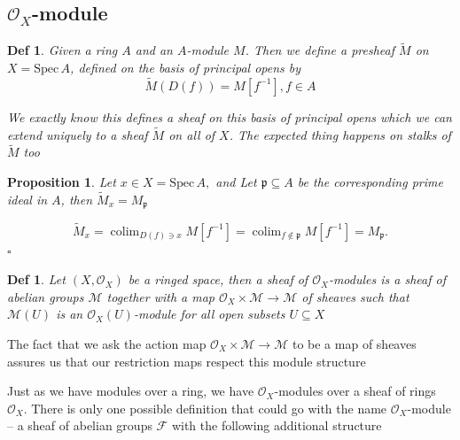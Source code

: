 \documentclass{article}
\newtheorem{definition}[theorem]{Def}
\newtheorem{proposition}[theorem]{Proposition}
\newenvironment{Proof}{{\noindent \indent \it Proof:\quad}}{\hfill $\square$\par}
\begin{document}



\newpage
\subsection{$\mathcal O_X$-module}
\begin{definition}
    Given a ring $A$ and an $A$-module $M$. Then we define a presheaf $\widetilde{M}$ on $X={\mathrm{Spec}}\,A$, defined on the basis of principal opens by
$$
\widetilde{M}(D(f))=M[f^{-1}],f\in A 
$$

We exactly know this defines a sheaf on this basis of principal opens which we can extend uniquely to a sheaf $\widetilde{{M}}$ on all of $X$. The expected thing happens on stalks of $\widetilde{{M}}$ too
\end{definition}

\begin{proposition}
    Let $x\in X={\mathrm{Spec}}\,A,$ and Let ${\mathfrak{p}}\subseteq A$ be the corresponding prime ideal in $A$, then $\widetilde{M}_{x}=M_{\mathfrak{p}}$
\end{proposition}

\begin{Proof}
$$
\widetilde{M}_{x}=\operatorname{colim}_{D(f)\ni x}M[f^{-1}]=\operatorname{colim}_{f\notin{\mathfrak{p}}}M[f^{-1}]=M_{\mathfrak{p}}. 
$$
\end{Proof}

\begin{definition}
Let $(X,{\mathcal{O}}_{X})$ be a ringed space, then a sheaf of ${\mathcal{O}}_{X}$-modules is a sheaf of abelian groups $\mathcal M$ together with a map ${\mathcal{O}}_{X}\times{\mathcal{M}} \to{\mathcal{M}}$ of sheaves such that ${\mathcal{M}}(U)$ is an ${\mathcal{O}}_{X}(U)$-module for all open subsets $U\subseteq X$ 
\end{definition}

The fact that we ask the action map ${\mathcal{O}}_{X}\times{\mathcal{M}} \to{\mathcal{M}}$ to be a map of sheaves assures us that our restriction maps respect this module structure

Just as we have modules over a ring, we have ${\mathcal{O}}_{X}$-modules over a sheaf of rings ${\mathcal{O}}_{X}$. There is only one possible definition that could go with the name ${\mathcal{O}}_{X}$-module -- a sheaf of abelian groups $\mathcal{F}$ with the following additional structure
\end{document}
